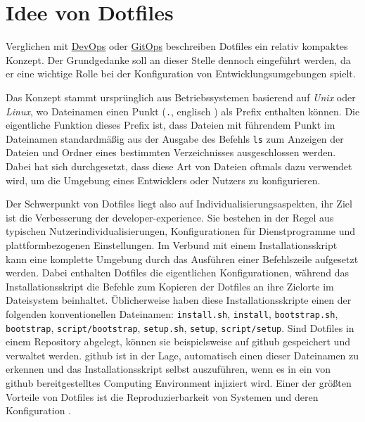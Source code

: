 \section{Idee von Dotfiles}
\label{sec:03-04_idea-of-dotfiles}

Verglichen mit \hyperref[sec:03-01_introduction-to-devops]{DevOps} oder \hyperref[sec:03-03_gitops-as-further-evolution]{GitOps} beschreiben Dotfiles ein relativ kompaktes Konzept. Der Grundgedanke soll an dieser Stelle dennoch eingeführt werden, da er eine wichtige Rolle bei der Konfiguration von Entwicklungsumgebungen spielt.

Das Konzept stammt ursprünglich aus Betriebssystemen basierend auf \textit{Unix} oder \textit{Linux}, wo Dateinamen einen Punkt (\texttt{.}, englisch ) als Prefix enthalten können. Die eigentliche Funktion dieses Prefix ist, dass Dateien mit führendem Punkt im Dateinamen standardmäßig aus der Ausgabe des Befehls \texttt{ls} zum Anzeigen der Dateien und Ordner eines bestimmten Verzeichnisses ausgeschlossen werden. Dabei hat sich durchgesetzt, dass diese Art von Dateien oftmals dazu verwendet wird, um die Umgebung eines Entwicklers oder Nutzers zu konfigurieren. \cite{029:Connecting-the-Dotfiles}

Der Schwerpunkt von Dotfiles liegt also auf Individualisierungsaspekten, ihr Ziel ist die Verbesserung der \Gls{developer-experience}. Sie bestehen in der Regel aus typischen Nutzerindividualisierungen, Konfigurationen für Dienstprogramme und plattformbezogenen Einstellungen. Im Verbund mit einem Installationsskript kann eine komplette Umgebung durch das Ausführen einer Befehlszeile aufgesetzt werden. Dabei enthalten Dotfiles die eigentlichen Konfigurationen, während das Installationsskript die Befehle zum Kopieren der Dotfiles an ihre Zielorte im Dateisystem beinhaltet. \cite{203:Dev-Environment-as-a-Code-with-DevContainers-Dotfiles-and-GitHub-Codespaces} Üblicherweise haben diese Installationsskripte einen der folgenden konventionellen Dateinamen: \texttt{install.sh}, \texttt{install}, \texttt{bootstrap.sh}, \texttt{bootstrap}, \texttt{script/bootstrap}, \texttt{setup.sh}, \texttt{setup}, \texttt{script/setup}. Sind Dotfiles in einem Repository abgelegt, können sie beispielsweise auf \Gls{github} gespeichert und verwaltet werden. \Gls{github} ist in der Lage, automatisch einen dieser Dateinamen zu erkennen und das Installationsskript selbst auszuführen, wenn es in ein von \Gls{github} bereitgestelltes Computing Environment injiziert wird. \cite{304:Personalizing-GitHub-Codespaces-for-your-Account} Einer der größten Vorteile von Dotfiles ist die Reproduzierbarkeit von Systemen und deren Konfiguration \cite{029:Connecting-the-Dotfiles}.

